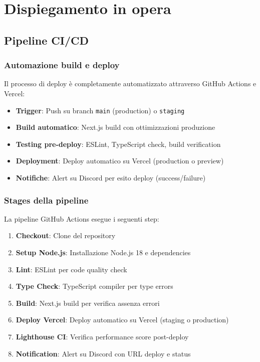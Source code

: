 \chapter{Dispiegamento in opera}

\section{Pipeline CI/CD}
\subsection{Automazione build e deploy}
Il processo di deploy è completamente automatizzato attraverso GitHub 
Actions e Vercel:

\begin{itemize}
  \item \textbf{Trigger}: Push su branch \texttt{main} (production) o 
        \texttt{staging}
  \item \textbf{Build automatico}: Next.js build con ottimizzazioni 
        produzione
  \item \textbf{Testing pre-deploy}: ESLint, TypeScript check, build 
        verification
  \item \textbf{Deployment}: Deploy automatico su Vercel (production o 
        preview)
  \item \textbf{Notifiche}: Alert su Discord per esito deploy 
        (success/failure)
\end{itemize}

\subsection{Stages della pipeline}
La pipeline GitHub Actions esegue i seguenti step:

\begin{enumerate}
  \item \textbf{Checkout}: Clone del repository
  \item \textbf{Setup Node.js}: Installazione Node.js 18 e dependencies
  \item \textbf{Lint}: ESLint per code quality check
  \item \textbf{Type Check}: TypeScript compiler per type errors
  \item \textbf{Build}: Next.js build per verifica assenza errori
  \item \textbf{Deploy Vercel}: Deploy automatico su Vercel (staging o 
        production)
  \item \textbf{Lighthouse CI}: Verifica performance score post-deploy
  \item \textbf{Notification}: Alert su Discord con URL deploy e status
\end{enumerate}

